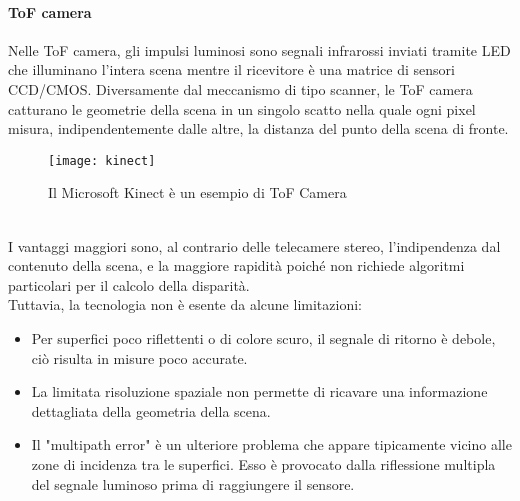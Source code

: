 \paragraph{ToF camera}
Nelle ToF camera, gli impulsi luminosi sono segnali infrarossi inviati tramite LED che illuminano l'intera scena mentre il ricevitore è una matrice di sensori CCD/CMOS. Diversamente dal meccanismo di tipo scanner, le ToF camera catturano le geometrie della scena in un singolo scatto nella quale ogni pixel misura, indipendentemente dalle altre, la distanza del punto della scena di fronte.
\begin{figure}[ht]
    \centering
    \texttt{[image: kinect]}
    \caption[Microsoft Kinect]{Il Microsoft Kinect è un esempio di ToF Camera}
\end{figure}\\
I vantaggi maggiori sono, al contrario delle telecamere stereo, l'indipendenza dal contenuto della scena, e la maggiore rapidità poiché non richiede algoritmi particolari per il calcolo della disparità. \\
Tuttavia, la tecnologia non è esente da alcune limitazioni: 
\begin{itemize}
    \item Per superfici poco riflettenti o di colore scuro, il segnale di ritorno è debole, ciò risulta in misure poco accurate. 
    \item La limitata risoluzione spaziale non permette di ricavare una informazione dettagliata della geometria della scena.
    \item Il "multipath error" è un ulteriore problema che appare tipicamente vicino alle zone di incidenza tra le superfici. Esso è provocato dalla riflessione multipla del segnale luminoso prima di raggiungere il sensore. 
\end{itemize}

